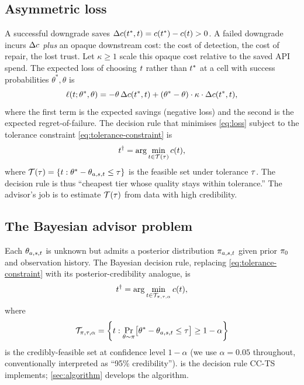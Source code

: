 \subsection{Asymmetric loss}

A successful downgrade saves $\Delta c(t^*, t) =
c(t^*) - c(t) > 0$. A failed downgrade incurs $\Delta c$
\emph{plus} an opaque downstream cost: the cost of detection, the cost of
repair, the lost trust. Let $\kappa \geq 1$ scale this opaque cost relative
to the saved API spend. The expected loss of choosing $t$ rather than
$t^*$ at a cell with success probabilities $\theta^*, \theta$ is
\begin{equation}
  \ell(t; \theta^*, \theta)
    = -\theta \, \Delta c(t^*, t)
      + (\theta^* - \theta) \cdot \kappa \cdot \Delta c(t^*, t),
  \label{eq:loss}
\end{equation}
where the first term is the expected savings (negative loss) and the second
is the expected regret-of-failure. The decision rule that minimises
\cref{eq:loss} subject to the tolerance constraint
\cref{eq:tolerance-constraint} is
\begin{equation}
  t^\dagger
    = \arg\min_{t \in \mathcal{T}(\tau)}
      c(t),
  \label{eq:decision}
\end{equation}
where
\(
  \mathcal{T}(\tau) = \{ t : \theta^* - \theta_{a,s,t} \leq \tau \}
\)
is the feasible set under tolerance $\tau$. The decision rule is thus
``cheapest tier whose quality stays within tolerance.'' The advisor's job is
to estimate $\mathcal{T}(\tau)$ from data with high credibility.

\subsection{The Bayesian advisor problem}

Each $\theta_{a,s,t}$ is unknown but admits a posterior
distribution $\pi_{a,s,t}$ given prior $\pi_0$ and
observation history. The Bayesian decision rule, replacing
\cref{eq:tolerance-constraint} with its posterior-credibility analogue, is
\begin{equation}
  t^\dagger
    = \arg\min_{t \in \mathcal{T}_{\pi, \tau, \alpha}}
      c(t),
  \label{eq:bayesian-decision}
\end{equation}
where
\begin{equation}
  \mathcal{T}_{\pi, \tau, \alpha}
    = \left\{ t : \Pr_{\theta \sim \pi}\!\big[
        \theta^* - \theta_{a,s,t} \leq \tau
      \big] \geq 1 - \alpha
    \right\}
  \label{eq:credible-feasible}
\end{equation}
is the credibly-feasible set at confidence level $1 - \alpha$ (we use
$\alpha = 0.05$ throughout, conventionally interpreted as ``95\%
credibility'').  is the decision rule CC-TS
implements; \cref{sec:algorithm} develops the algorithm.


